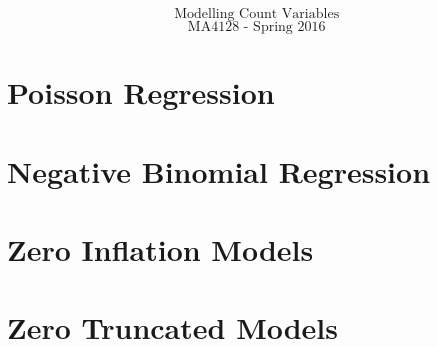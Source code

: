 \documentclass{beamer}
\begin{document}
\begin{frame}
	\huge
	\[ \mbox{Modelling Count Variables } \]
	\Large
	\[ \mbox{MA4128 - Spring 2016  } \]
	\end{frame}





\section{Poisson Regression}

%
%

% 

\section{Negative Binomial Regression}


%

\section{Zero Inflation Models}

% 


% 
\section{Zero Truncated Models}




%
\end{document}
